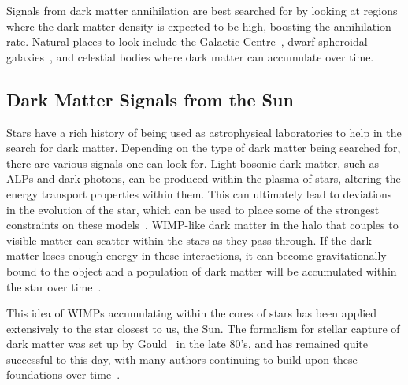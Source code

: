 Signals from dark matter annihilation are best searched for by looking at regions where the dark matter density is expected to be high, boosting the annihilation rate. 
Natural places to look include the Galactic Centre~\cite{Ipek:2014gua_sep_RenormalizableModelGalactic,Fermi-LAT:2017opo_may_FermiGalacticCenter}, dwarf-spheroidal galaxies~\cite{Bonnivard:2015xpq_oct_Darkmatterannihilation}, and celestial bodies where dark matter can accumulate over time.



\subsection{Dark Matter Signals from the Sun}

Stars have a rich history of being used as astrophysical laboratories to help in the search for dark matter. Depending on the type of dark matter being searched for, there are various signals one can look for.
Light bosonic dark matter, such as ALPs and dark photons, can be produced within the plasma of stars, altering the energy transport properties within them.
This can ultimately lead to deviations in the evolution of the star, which can be used to place some of the strongest constraints on these models~\cite{An:2013yfc_oct_Newstellarconstraints, Dolan:2022kul_oct_Advancingglobularcluster,Dolan:2023cjs_jun_ConstrainingDarkPhotons}.
WIMP-like dark matter in the halo that couples to visible matter can scatter within the stars as they pass through. 
If the dark matter loses enough energy in these interactions, it can become gravitationally bound to the object and a population of dark matter will be accumulated within the star over time~\cite{Press:1985ug_Capturesungalactic, Gould:1987ju_WeaklyInteractingMassive, Gould:1987ir_ResonantEnhancementsWIMP,Jungman:1995df_Supersymmetricdarkmatter,Busoni:2017mhe_oct_Evaporationscatteringmomentum}. 

This idea of WIMPs accumulating within the cores of stars has been applied extensively to the star closest to us, the Sun. The formalism for stellar capture of dark matter was set up by Gould~\cite{Gould:1987ir_ResonantEnhancementsWIMP,Gould:1987ju_WeaklyInteractingMassive,Gould:1991va_Bigbangarcheology} in the late 80's, and has remained quite successful to this day,  with many authors continuing to build upon these foundations over time~\cite{Busoni:2017mhe_oct_Evaporationscatteringmomentum,Garani:2017jcj_may_DarkmatterSun,Bramante:2017xlb_sep_Multiscatterstellarcapture}.

